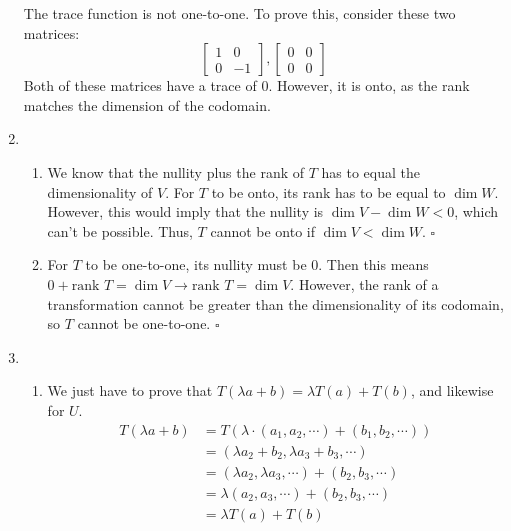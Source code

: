 \documentclass[12pt]{article}
\begin{document}
\begin{enumerate}
            The trace function is not one-to-one.
            To prove this, consider these two matrices:
            \[\begin{bmatrix} 1 & 0 \\ 0 & -1 \end{bmatrix},
                  \begin{bmatrix} 0 & 0 \\ 0 & 0 \end{bmatrix}\]
            Both of these matrices have a trace of $0$.
            However, it is onto, as the rank matches the dimension of the codomain.
      \item \begin{enumerate}
                  \item We know that the nullity plus the rank of $T$ has to equal the dimensionality of $V$.
                        For $T$ to be onto, its rank has to be equal to $\dim W$.
                        However, this would imply that the nullity is $\dim V - \dim W < 0$, which can't be possible.
                        Thus, $T$ cannot be onto if $\dim V < \dim W$. $\square$
                  \item For $T$ to be one-to-one, its nullity must be $0$.
                        Then this means $0+\text{rank } T=\dim V \rightarrow \text{rank } T=\dim V$.
                        However, the rank of a transformation cannot be greater than the dimensionality
                        of its codomain, so $T$ cannot be one-to-one. $\square$
            \end{enumerate}
      \item \begin{enumerate}
                  \item We just have to prove that $T(\lambda a+b)=\lambda T(a)+T(b)$, and likewise for $U$.
                        \begin{align*}
                              T(\lambda a+b) & =T(\lambda \cdot (a_1, a_2, \cdots) + (b_1, b_2, \cdots)) \\
                                             & =(\lambda a_2+b_2, \lambda a_3+b_3, \cdots)               \\
                                             & =(\lambda a_2, \lambda a_3, \cdots)+(b_2, b_3, \cdots)    \\
                                             & =\lambda (a_2, a_3, \cdots)+(b_2, b_3, \cdots)            \\
                                             & =\lambda T(a)+T(b)

\end{align*}
\end{enumerate}
\end{enumerate}
\end{document}
